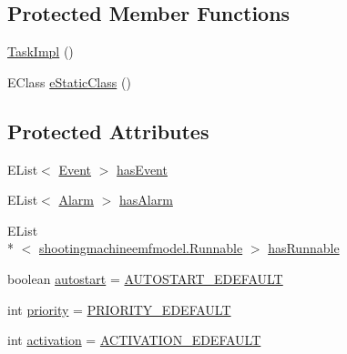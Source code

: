 \subsection*{Protected Member Functions}
\begin{DoxyCompactItemize}
\item 
\hyperlink{classshootingmachineemfmodel_1_1impl_1_1_task_impl_ae8c893b4e441c621b94f3233b9b84e89}{Task\-Impl} ()
\item 
E\-Class \hyperlink{classshootingmachineemfmodel_1_1impl_1_1_task_impl_aa5209451ca4d0d9a7e0863845e0dc7dd}{e\-Static\-Class} ()
\end{DoxyCompactItemize}
\subsection*{Protected Attributes}
\begin{DoxyCompactItemize}
\item 
E\-List$<$ \hyperlink{interfaceshootingmachineemfmodel_1_1_event}{Event} $>$ \hyperlink{classshootingmachineemfmodel_1_1impl_1_1_task_impl_aaa5109e45db99d7301d1b741bf18a643}{has\-Event}
\item 
E\-List$<$ \hyperlink{interfaceshootingmachineemfmodel_1_1_alarm}{Alarm} $>$ \hyperlink{classshootingmachineemfmodel_1_1impl_1_1_task_impl_a07d141523212532cf44121a1029725aa}{has\-Alarm}
\item 
E\-List\\*
$<$ \hyperlink{interfaceshootingmachineemfmodel_1_1_runnable}{shootingmachineemfmodel.\-Runnable} $>$ \hyperlink{classshootingmachineemfmodel_1_1impl_1_1_task_impl_ab64e4bc56b206c3a4df9ea8dcf3cc2c9}{has\-Runnable}
\item 
boolean \hyperlink{classshootingmachineemfmodel_1_1impl_1_1_task_impl_af507c96bd2095cb7aedc71eb82918fed}{autostart} = \hyperlink{classshootingmachineemfmodel_1_1impl_1_1_task_impl_a70eecc221cc934d53c7dd6695a9803fe}{A\-U\-T\-O\-S\-T\-A\-R\-T\-\_\-\-E\-D\-E\-F\-A\-U\-L\-T}
\item 
int \hyperlink{classshootingmachineemfmodel_1_1impl_1_1_task_impl_ad56bbc62c27ba87c3f2918e3dc2c4227}{priority} = \hyperlink{classshootingmachineemfmodel_1_1impl_1_1_task_impl_af278a531c9292c228130ebdf1638301a}{P\-R\-I\-O\-R\-I\-T\-Y\-\_\-\-E\-D\-E\-F\-A\-U\-L\-T}
\item 
int \hyperlink{classshootingmachineemfmodel_1_1impl_1_1_task_impl_a71b95de4d8769109b08e6a55b2d413c1}{activation} = \hyperlink{classshootingmachineemfmodel_1_1impl_1_1_task_impl_a1091e4f368608ccd335964978b9ba4dc}{A\-C\-T\-I\-V\-A\-T\-I\-O\-N\-\_\-\-E\-D\-E\-F\-A\-U\-L\-T}
\end{DoxyCompactItemize}
